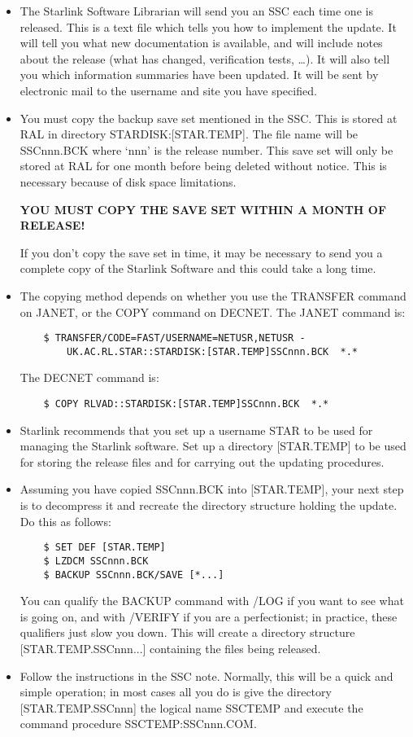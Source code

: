 \begin{itemize}
\item The Starlink Software Librarian will send you an SSC each time one is
released.
This is a text file which tells you how to implement the update.
It will tell you what new documentation is available, and will include notes
about the release (what has changed, verification tests, \ldots).
It will also tell you which information summaries have been updated.
It will be sent by electronic mail to the username and site you have specified.
\item You must copy the backup save set mentioned in the SSC.
This is stored at RAL in directory STARDISK:[STAR.TEMP].
The file name will be SSCnnn.BCK where `nnn' is the release number.
This save set will only be stored at RAL for one month before being deleted
without notice.
This is necessary because of disk space limitations.

{\bf YOU MUST COPY THE SAVE SET WITHIN A MONTH OF RELEASE!}

If you don't copy the save set in time, it may be necessary to send you a
complete copy of the Starlink Software and this could take a long time.
\item The copying method depends on whether you use the TRANSFER command on
JANET, or the COPY command on DECNET.
The JANET command is:
\begin{verbatim}
    $ TRANSFER/CODE=FAST/USERNAME=NETUSR,NETUSR -
        UK.AC.RL.STAR::STARDISK:[STAR.TEMP]SSCnnn.BCK  *.*
\end{verbatim}
The DECNET command is:
\begin{verbatim}
    $ COPY RLVAD::STARDISK:[STAR.TEMP]SSCnnn.BCK  *.*
\end{verbatim}
\item Starlink recommends that you set up a username STAR to be used for
managing the Starlink software.
Set up a directory [STAR.TEMP] to be used for storing the release files and
for carrying out the updating procedures.
\item Assuming you have copied SSCnnn.BCK into [STAR.TEMP], your next step is
to decompress it and recreate the directory structure holding the update.
Do this as follows:
\begin{verbatim}
    $ SET DEF [STAR.TEMP]
    $ LZDCM SSCnnn.BCK
    $ BACKUP SSCnnn.BCK/SAVE [*...]
\end{verbatim}
You can qualify the BACKUP command with /LOG if you want to see what is going
on, and with /VERIFY if you are a perfectionist; in practice, these qualifiers
just slow you down.
This will create a directory structure [STAR.TEMP.SSCnnn...] containing the
files being released.
\item Follow the instructions in the SSC note.
Normally, this will be a quick and simple operation; in most cases all you do is
give the directory [STAR.TEMP.SSCnnn] the logical name SSCTEMP and execute the
command procedure SSCTEMP:SSCnnn.COM.
\end{itemize}
